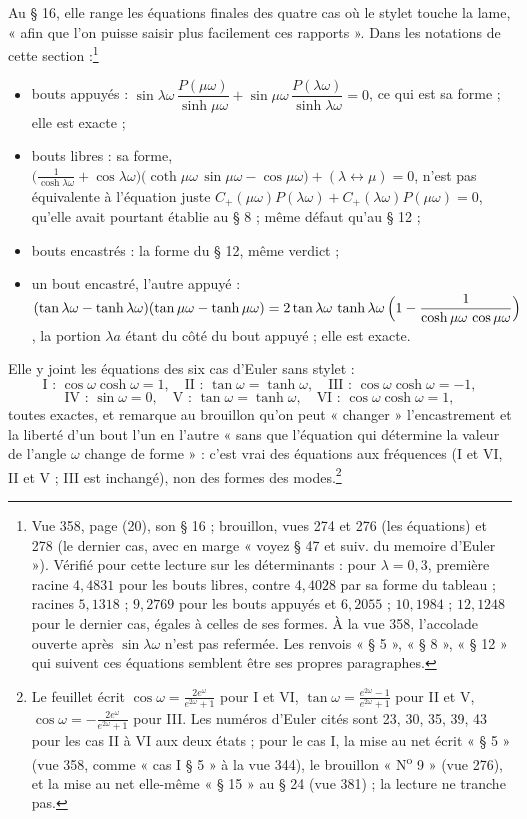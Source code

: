 \documentclass[11pt,a4paper]{article}
\begin{document}
Au § 16, elle range les équations finales des quatre cas où le stylet touche la lame, « afin que l'on puisse saisir plus facilement ces rapports ». Dans les notations de cette section :\footnote{Vue 358, page (20), son § 16 ; brouillon, vues 274 et 276 (les équations) et 278 (le dernier cas, avec en marge « voyez § 47 et suiv. du memoire d'Euler »). Vérifié pour cette lecture sur les déterminants : pour $\lambda=0{,}3$, première racine $4{,}4831$ pour les bouts libres, contre $4{,}4028$ par sa forme du tableau ; racines $5{,}1318$ ; $9{,}2769$ pour les bouts appuyés et $6{,}2055$ ; $10{,}1984$ ; $12{,}1248$ pour le dernier cas, égales à celles de ses formes. À la vue 358, l'accolade ouverte après $\sin\lambda\omega$ n'est pas refermée. Les renvois « § 5 », « § 8 », « § 12 » qui suivent ces équations semblent être ses propres paragraphes.}
\begin{itemize}
\item bouts appuyés : $\sin\lambda\omega\,\dfrac{P(\mu\omega)}{\sinh\mu\omega}+\sin\mu\omega\,\dfrac{P(\lambda\omega)}{\sinh\lambda\omega}=0$, ce qui est sa forme ; elle est exacte ;
\item bouts libres : sa forme, $\bigl(\frac{1}{\cosh\lambda\omega}+\cos\lambda\omega\bigr)\bigl(\coth\mu\omega\,\sin\mu\omega-\cos\mu\omega\bigr)+(\lambda\leftrightarrow\mu)=0$, n'est pas équivalente à l'équation juste $C_{+}(\mu\omega)P(\lambda\omega)+C_{+}(\lambda\omega)P(\mu\omega)=0$, qu'elle avait pourtant établie au § 8 ; même défaut qu'au § 12 ;
\item bouts encastrés : la forme du § 12, même verdict ;
\item un bout encastré, l'autre appuyé : $(\tan\lambda\omega-\tanh\lambda\omega)(\tan\mu\omega-\tanh\mu\omega)=2\tan\lambda\omega\,\tanh\lambda\omega\,\Bigl(1-\dfrac{1}{\cosh\mu\omega\,\cos\mu\omega}\Bigr)$, la portion $\lambda a$ étant du côté du bout appuyé ; elle est exacte.
\end{itemize}
Elle y joint les équations des six cas d'Euler sans stylet :
\[
\text{I : }\cos\omega\cosh\omega=1,\quad
\text{II : }\tan\omega=\tanh\omega,\quad
\text{III : }\cos\omega\cosh\omega=-1,
\]
\[
\text{IV : }\sin\omega=0,\quad
\text{V : }\tan\omega=\tanh\omega,\quad
\text{VI : }\cos\omega\cosh\omega=1,
\]
toutes exactes, et remarque au brouillon qu'on peut « changer » l'encastrement et la liberté d'un bout l'un en l'autre « sans que l'équation qui détermine la valeur de l'angle $\omega$ change de forme » : c'est vrai des équations aux fréquences (I et VI, II et V ; III est inchangé), non des formes des modes.\footnote{Le feuillet écrit $\cos\omega=\frac{2e^{\omega}}{e^{2\omega}+1}$ pour I et VI, $\tan\omega=\frac{e^{2\omega}-1}{e^{2\omega}+1}$ pour II et V, $\cos\omega=-\frac{2e^{\omega}}{e^{2\omega}+1}$ pour III. Les numéros d'Euler cités sont 23, 30, 35, 39, 43 pour les cas II à VI aux deux états ; pour le cas I, la mise au net écrit « § 5 » (vue 358, comme « cas I § 5 » à la vue 344), le brouillon « N\textsuperscript{o} 9 » (vue 276), et la mise au net elle-même « § 15 » au § 24 (vue 381) ; la lecture ne tranche pas.}
\end{document}
